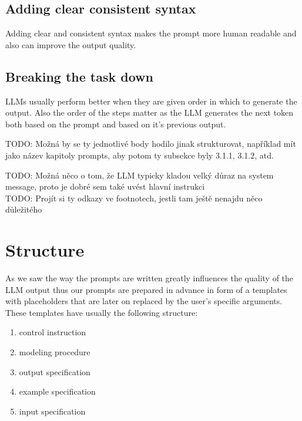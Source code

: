 \subsection{Adding clear consistent syntax}
Adding clear and consistent syntax makes the prompt more human readable and also can improve the output quality.


\subsection{Breaking the task down}
LLMs usually perform better when they are given order in which to generate the output. Also the order of the steps matter as the LLM generates the next token both based on the prompt and based on it's previous output.



TODO: Možná by se ty jednotlivé body hodilo jinak strukturovat, například mít jako název kapitoly prompts, aby potom ty subsekce byly 3.1.1, 3.1.2, atd.

TODO: Možná něco o tom, že LLM typicky kladou velký důraz na system message, proto je dobré sem také uvést hlavní instrukci \\

TODO: Projít si ty odkazy ve footnotech, jestli tam ještě nenajdu něco důležitého \\


\section{Structure}

As we saw the way the prompts are written greatly influences the quality of the LLM output thus our prompts are prepared in advance in form of a templates with placeholders that are later on replaced by the user's specific arguments. These templates have usually the following structure:

\begin{enumerate}
\item control instruction
\item modeling procedure
\item output specification
\item example specification
\item input specification \\
\end{enumerate}

